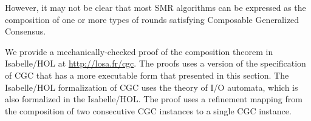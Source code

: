 However, it may not be clear that most SMR algorithms can be expressed as the composition of one or more types of rounds satisfying Composable Generalized Consensus.

We provide a mechanically-checked proof of the composition theorem in Isabelle/HOL at \url{http://losa.fr/cgc}.
The proofs uses a version of the specification of CGC that has a more
executable form that presented in this section. 
The Isabelle/HOL formalization of CGC uses the theory of I/O automata, which
is also formalized in the Isabelle/HOL. The proof uses a refinement
mapping from the composition of two consecutive CGC instances to a single CGC
instance.

\begin{comment}
\begin{thm}[Composition Theorem]
    \label{thm:comp}
    In every execution of a succession of CGC instances, the history of valuations
    of the variable $proposed$ and, for every learner $l$, of the variables
    $learned\left[ l \right]$ satisfies Generalized Consensus.
\end{thm}
\Cref{thm:comp} can be shown by induction on the number of rounds,
using the following lemma.
\begin{lem}
  \label{lem:comp}
    Consider two rounds numbered $i$ and $i+1$. In every execution of a
    succession of CGC instances, the history of valuations of the variables $inits
    = inits_i$, $propose = proposed_i \cup propose_{i+1}$, for every learner
    $l$, $learned\left[ l \right] = learned_i\left[ l \right] \cup
    learned_{i+1}\left[ l \right]$and $aborts = aborts_{i+1}$ satisfies CGC.
\end{lem}
\begin{proof}
  A mechanically-checked proof in Isabelle/HOL appears in \cref{sec:isaproofs}.
  The proofs uses a version of the specification of CGC that has a more
  executable form that presented in this section. Moreover,
  instead of history of commands, the Isabelle/HOL specification uses the more
  general notion of command history, presented in the next subsection.
  The Isabelle/HOL formalization of CGC uses the theory of I/O automata, which
  is also formalized in the Isabelle/HOL. The proof uses a refinement
  mapping from the composition of two consecutive CGC instances to a single CGC
  instance.
\end{proof}

\Cref{thm:comp} guarantees that the successive composition of any
number of CGC instances implements Generalized Consensus.
Therefore, with CGC, one can easily build replicated services that
dynamically adapt to the current operating conditions of the system: a
replicated service has several types of rounds at its disposal, each being
tailored to particular conditions. Each time the conditions change,
the current CGC instance aborts and passes the baton to a more 
appropriate type of round, as determined by the scheduling policy. Moreover, a new type
of CGC instance can always be devised after the system is deployed and added on the fly to
the existing types of rounds.


\end{comment}
